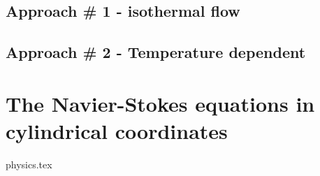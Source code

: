 \subsection{Approach \# 1 - isothermal flow \label{ss:dimeqs1}}


\subsection{Approach \# 2 - Temperature dependent \label{ss:dimeqs2}}








\newpage
\section{The Navier-Stokes equations in cylindrical coordinates}
\begin{flushright} {\tiny {\color{gray} physics.tex}} \end{flushright}

